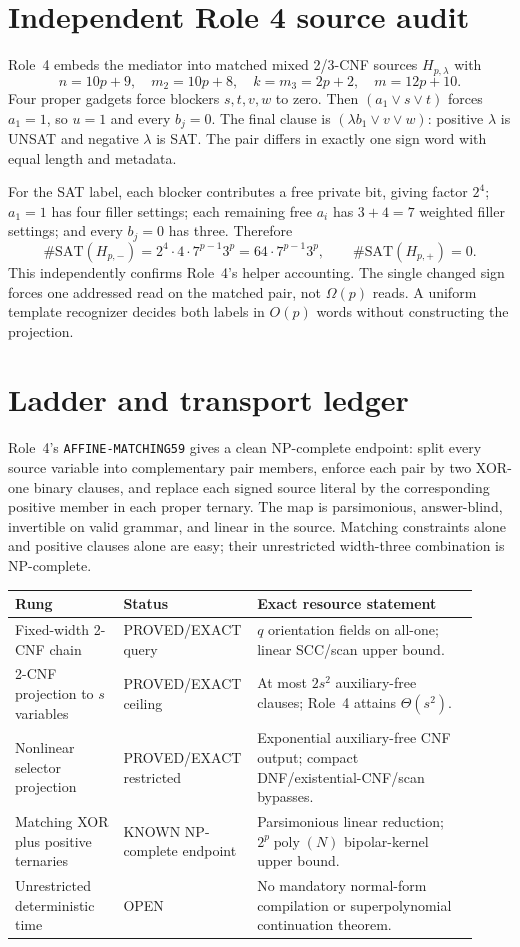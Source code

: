 \documentclass[11pt]{article}
\begin{document}
\section{Independent Role 4 source audit}
Role~4 embeds the mediator into matched mixed 2/3-CNF sources $H_{p,\lambda}$ with
\[
n=10p+9,\quad m_2=10p+8,\quad k=m_3=2p+2,\quad m=12p+10.
\]
Four proper gadgets force blockers $s,t,v,w$ to zero. Then $(a_1\vee s\vee t)$ forces $a_1=1$, so $u=1$ and every $b_j=0$. The final clause is $(\lambda b_1\vee v\vee w)$: positive $\lambda$ is UNSAT and negative $\lambda$ is SAT. The pair differs in exactly one sign word with equal length and metadata.

For the SAT label, each blocker contributes a free private bit, giving factor $2^4$; $a_1=1$ has four filler settings; each remaining free $a_i$ has $3+4=7$ weighted filler settings; and every $b_j=0$ has three. Therefore
\[
\#\mathrm{SAT}(H_{p,-})=
2^4\cdot4\cdot7^{p-1}3^p
=64\cdot7^{p-1}3^p,
\qquad
\#\mathrm{SAT}(H_{p,+})=0.
\]
This independently confirms Role~4's helper accounting. The single changed sign forces one addressed read on the matched pair, not $\Omega(p)$ reads. A uniform template recognizer decides both labels in $O(p)$ words without constructing the projection.

\section{Ladder and transport ledger}
Role~4's \texttt{AFFINE-MATCHING59} gives a clean NP-complete endpoint: split every source variable into complementary pair members, enforce each pair by two XOR-one binary clauses, and replace each signed source literal by the corresponding positive member in each proper ternary. The map is parsimonious, answer-blind, invertible on valid grammar, and linear in the source. Matching constraints alone and positive clauses alone are easy; their unrestricted width-three combination is NP-complete.

\begin{center}\small
\begin{tabular}{p{0.23\linewidth}p{0.22\linewidth}p{0.47\linewidth}}
\toprule
Rung & Status & Exact resource statement\\
\midrule
Fixed-width 2-CNF chain & PROVED/EXACT query & $q$ orientation fields on all-one; linear SCC/scan upper bound.\\
2-CNF projection to $s$ variables & PROVED/EXACT ceiling & At most $2s^2$ auxiliary-free clauses; Role~4 attains $\Theta(s^2)$.\\
Nonlinear selector projection & PROVED/EXACT restricted & Exponential auxiliary-free CNF output; compact DNF/existential-CNF/scan bypasses.\\
Matching XOR plus positive ternaries & KNOWN NP-complete endpoint & Parsimonious linear reduction; $2^p\operatorname{poly}(N)$ bipolar-kernel upper bound.\\
Unrestricted deterministic time & OPEN & No mandatory normal-form compilation or superpolynomial continuation theorem.\\
\bottomrule
\end{tabular}
\end{center}
\end{document}
